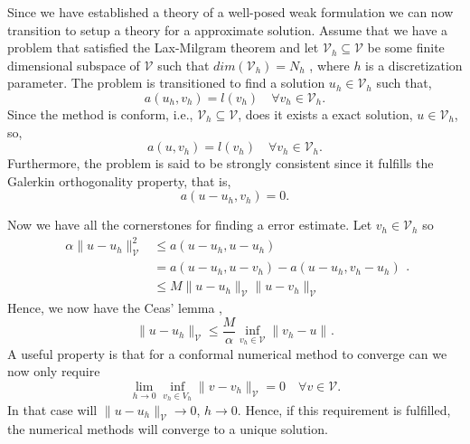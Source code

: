 Since we have established a theory of a well-posed weak formulation we can now transition to setup a theory for a approximate solution. Assume that we have a problem that satisfied the Lax-Milgram theorem and let $\mathcal{V} _{h} \subseteq  \mathcal{V} $  be
some finite dimensional subspace of $\mathcal{V} $ such that $dim\left( \mathcal{V} _{h} \right) =N_{h}$ , where $h$  is a discretization parameter. The problem is transitioned to find a solution $u_{h} \in  \mathcal{V}_{h}$ such that,
$$a\left( u_{h},v_{h} \right)  =
l\left( v_{h} \right) \quad  \forall v_{h} \in \mathcal{V} _{h} .$$
Since the method is conform, i.e., $\mathcal{V} _{h} \subseteq  \mathcal{V} $, does it exists a exact solution, $u \in  \mathcal{V} _{h}$, so, \[
a \left( u, v_{h} \right)  = l\left( v_{h} \right)  \quad  \forall v_{h} \in  \mathcal{V} _{h}.
\]
Furthermore, the problem is said to be strongly consistent since it fulfills the Galerkin orthogonality property, that is,
$$ a\left( u -u_{h} , v_{h} \right)  =0.$$

Now we have all the cornerstones for finding a error estimate. Let $v_{h} \in  \mathcal{V} _{h}$ so
\begin{equation}
\label{eq:cealemma_proof}
    \begin{split}
\alpha \| u -u_{h} \|_{ \mathcal{V}  }^{ 2 } & \le  a\left( u - u_{h}, u - u_{h}  \right)    \\
&= a\left( u - u_{h}, u -v_{h} \right) - a\left( u -u_{h}, v_{h} - u_{h} \right)  \\
 &  \le  M \| u - u_{h} \|_{ \mathcal{V}  }^{  }  \| u - v_{h} \|_{ \mathcal{V}  }^{  }
    \end{split}
.\end{equation}
Hence, we now have the Ceas' lemma \cite{quartdiff}, \[
\| u - u_{h} \|_{ \mathcal{V}  }^{  }  \le  \frac{M}{\alpha } \inf_{v_{h} \in \mathcal{V} } \|  v_{h} - u \|_{  }^{  }.
\]
A useful property is that for a conformal numerical method to converge can we now only require \[
\lim_{h \to 0}  \inf_{v_{h} \in  V_{h}}  \| v - v_{h} \|_{ \mathcal{V }  }^{  } = 0 \quad  \forall v \in \mathcal{V}.
\]
In that case will $\| u - u_{h} \|_{ \mathcal{V}  }^{  }  \to  0$, $h \to  0$. Hence, if this requirement is fulfilled, the numerical methods will converge to a unique solution.



